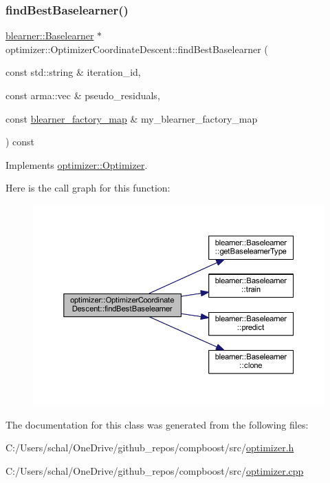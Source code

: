 \subsubsection{\texorpdfstring{find\+Best\+Baselearner()}{findBestBaselearner()}}
{\footnotesize\ttfamily \mbox{\hyperlink{classblearner_1_1_baselearner}{blearner\+::\+Baselearner}} $\ast$ optimizer\+::\+Optimizer\+Coordinate\+Descent\+::find\+Best\+Baselearner (\begin{DoxyParamCaption}\item[{const std\+::string \&}]{iteration\+\_\+id,  }\item[{const arma\+::vec \&}]{pseudo\+\_\+residuals,  }\item[{const \mbox{\hyperlink{baselearner__factory__list_8h_a058570e00ae11b882cfed36eb40be025}{blearner\+\_\+factory\+\_\+map}} \&}]{my\+\_\+blearner\+\_\+factory\+\_\+map }\end{DoxyParamCaption}) const\hspace{0.3cm}{\ttfamily [virtual]}}



Implements \mbox{\hyperlink{classoptimizer_1_1_optimizer_a134c7b34ed868231fbab53e9ebfa8fd8}{optimizer\+::\+Optimizer}}.

Here is the call graph for this function\+:
\nopagebreak
\begin{figure}[H]
\begin{center}
\leavevmode
\includegraphics[width=350pt]{classoptimizer_1_1_optimizer_coordinate_descent_af657f2f5f702bddab8c640368704d18c_cgraph}
\end{center}
\end{figure}


The documentation for this class was generated from the following files\+:\begin{DoxyCompactItemize}
\item 
C\+:/\+Users/schal/\+One\+Drive/github\+\_\+repos/compboost/src/\mbox{\hyperlink{optimizer_8h}{optimizer.\+h}}\item 
C\+:/\+Users/schal/\+One\+Drive/github\+\_\+repos/compboost/src/\mbox{\hyperlink{optimizer_8cpp}{optimizer.\+cpp}}\end{DoxyCompactItemize}
